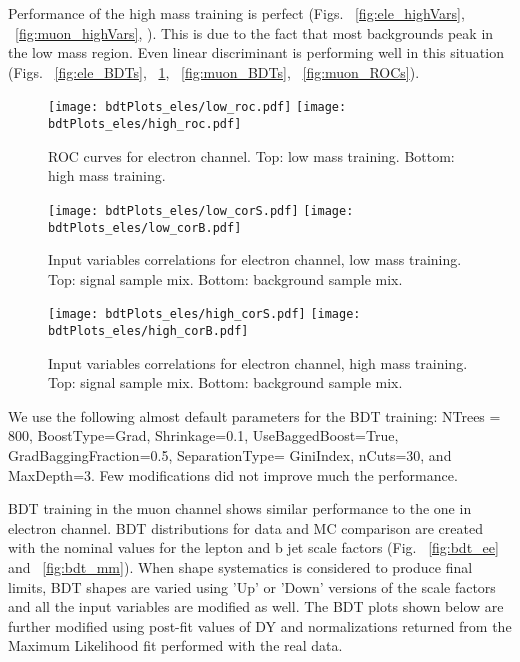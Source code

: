 Performance of the high mass training is perfect (Figs. ~\ref{fig:ele_highVars}, ~\ref{fig:muon_highVars}, ). This is due to the
fact that most backgrounds peak in the low mass region. Even linear
discriminant is performing well in this situation (Figs. ~\ref{fig:ele_BDTs}, ~\ref{fig:ele_ROCs}, ~\ref{fig:muon_BDTs}, ~\ref{fig:muon_ROCs}).

\begin{figure}[tbp]
  \begin{center}
   \texttt{[image: bdtPlots\_eles/low\_roc.pdf]}
   \texttt{[image: bdtPlots\_eles/high\_roc.pdf]}
    \caption{ ROC curves for electron channel. Top: low mass training. Bottom: high mass training. }
    \label{fig:ele_ROCs}
  \end{center}
\end{figure}

\begin{figure}[tbp]
  \begin{center}
   \texttt{[image: bdtPlots\_eles/low\_corS.pdf]}
   \texttt{[image: bdtPlots\_eles/low\_corB.pdf]}
    \caption{ Input variables correlations for electron channel, low mass training. Top: signal sample mix. Bottom: background sample mix. }
    \label{fig:ele_cors_low}
  \end{center}
\end{figure}


\begin{figure}[tbp]
  \begin{center}
   \texttt{[image: bdtPlots\_eles/high\_corS.pdf]}
   \texttt{[image: bdtPlots\_eles/high\_corB.pdf]}
    \caption{ Input variables correlations for electron channel, high mass training. Top: signal sample mix. Bottom: background sample mix. }
    \label{fig:ele_cors_high}
  \end{center}
\end{figure}


We use the following almost default parameters for the BDT training:
NTrees = 800, BoostType=Grad, Shrinkage=0.1, UseBaggedBoost=True,
GradBaggingFraction=0.5, SeparationType= GiniIndex, nCuts=30, and
MaxDepth=3. Few modifications did not improve much the performance.


BDT training in the muon channel shows similar performance to the one in electron channel.
BDT distributions for data and MC comparison are created with the nominal values for the lepton and b jet scale factors (Fig. ~\ref{fig:bdt_ee} and ~\ref{fig:bdt_mm}). When shape systematics is considered to produce final limits, BDT shapes are
varied using 'Up' or 'Down' versions of the scale factors and all the input variables are modified as well. The BDT plots shown below are further modified using post-fit values of DY and \ttbar normalizations returned from the Maximum Likelihood fit performed with the real data. 



